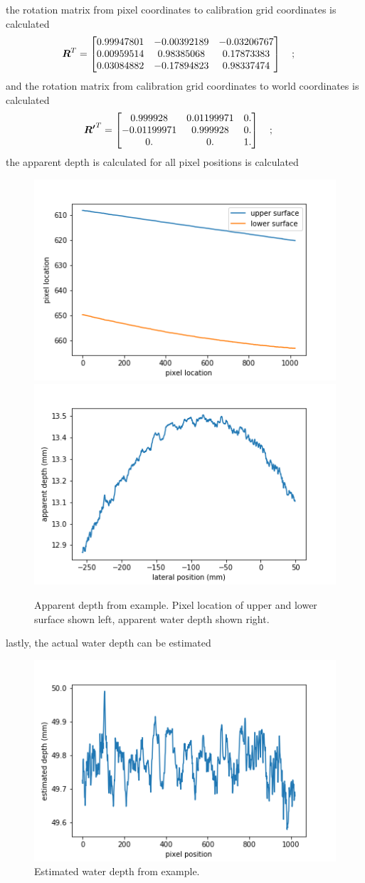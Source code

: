 the rotation matrix from pixel coordinates to calibration grid coordinates is calculated 
\begin{gather*}
	\boldsymbol{R}^T =
	\begin{bmatrix}
	0.99947801 & -0.00392189 & -0.03206767 \\
	0.00959514 & 0.98385068 & 0.17873383 \\
	0.03084882 & -0.17894823 & 0.98337474 \\
	\end{bmatrix} \text{\quad ; \quad}
\end{gather*}
and the rotation matrix from calibration grid coordinates to world coordinates is calculated
\begin{gather*}
	\boldsymbol{R'}^T = 
	\begin{bmatrix}
	0.999928 & 0.01199971 & 0. \\
	-0.01199971 & 0.999928 & 0. \\
	0. & 0. & 1. \\
	\end{bmatrix} \text{\quad ; \quad}
\end{gather*}
the apparent depth is calculated for all pixel positions is calculated
\begin{figure}[H]
	\centering
	\includegraphics[width=0.45 \linewidth]{../images/depth-example-pixel-locs.png}
	\includegraphics[width=0.45 \linewidth]{../images/depth-example-apparent.png}
	\caption{Apparent depth from example.
		Pixel location of upper and lower surface shown left, apparent water depth shown right.}
	\label{fig:depth_example_apparent}
\end{figure}
lastly, the actual water depth can be estimated
\begin{figure}[H]
	\centering
	\includegraphics[width=0.45 \linewidth]{../images/depth-example-estimated.png}
	\caption{Estimated water depth from example.}
	\label{fig:depth_example_estimated}
\end{figure}

